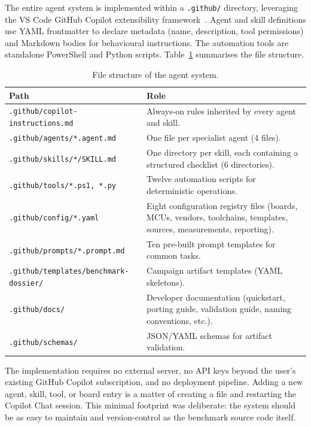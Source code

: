 The entire agent system is implemented within a \texttt{.github/} directory, leveraging the
VS Code GitHub Copilot extensibility framework~\cite{github-copilot, vscode-agent-mode,
vscode-custom-agents}.
Agent and skill definitions use YAML frontmatter to declare metadata (name, description,
tool permissions) and Markdown bodies for behavioural instructions. The automation tools are
standalone PowerShell and Python scripts. Table~\ref{tab:agent-impl} summarises the file
structure.

\begin{table}[H]
\centering
\caption{File structure of the agent system.}
\label{tab:agent-impl}
\begin{tabularx}{\textwidth}{l X}
\toprule
\textbf{Path} & \textbf{Role} \\
\midrule
\texttt{.github/copilot-instructions.md} & Always-on rules inherited by every agent and skill. \\
\texttt{.github/agents/*.agent.md} & One file per specialist agent (4 files). \\
\texttt{.github/skills/*/SKILL.md} & One directory per skill, each containing a structured checklist (6 directories). \\
\texttt{.github/tools/*.ps1, *.py} & Twelve automation scripts for deterministic operations. \\
\texttt{.github/config/*.yaml} & Eight configuration registry files (boards, MCUs, vendors, toolchains, templates, sources, measurements, reporting). \\
\texttt{.github/prompts/*.prompt.md} & Ten pre-built prompt templates for common tasks. \\
\texttt{.github/templates/benchmark-dossier/} & Campaign artifact templates (YAML skeletons). \\
\texttt{.github/docs/} & Developer documentation (quickstart, porting guide, validation guide, naming conventions, etc.). \\
\texttt{.github/schemas/} & JSON/YAML schemas for artifact validation. \\
\bottomrule
\end{tabularx}
\end{table}

The implementation requires no external server, no API keys beyond the user's existing
GitHub Copilot subscription, and no deployment pipeline. Adding a new agent, skill, tool,
or board entry is a matter of creating a file and restarting the Copilot Chat session. This
minimal footprint was deliberate: the system should be as easy to maintain and
version-control as the benchmark source code itself.

